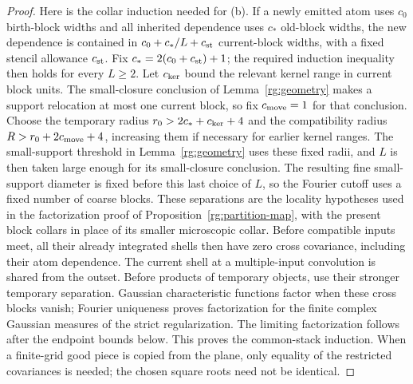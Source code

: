 \begin{proof}
Here is the collar induction needed for (b). If a newly emitted atom uses
$c_0$ birth-block widths and all inherited dependence uses $c_*$ old-block
widths, the new dependence is contained in
$c_0+c_*/L+c_{\rm st}$ current-block widths, with a fixed stencil allowance
$c_{\rm st}$. Fix $c_*=2(c_0+c_{\rm st})+1$; the required induction
inequality then holds for every $L\ge2$. Let $c_{\rm ker}$ bound the
relevant kernel range in current block units. The small-closure conclusion
of Lemma~\ref{rg:geometry} makes a support relocation at most one current
block, so fix $c_{\rm move}=1$ for that conclusion. Choose the temporary radius
$r_0>2c_*+c_{\rm ker}+4$ and the compatibility radius
$R>r_0+2c_{\rm move}+4$, increasing them if necessary for earlier
kernel ranges. The small-support threshold in Lemma~\ref{rg:geometry}
uses these fixed radii, and $L$ is then taken large enough for its
small-closure conclusion. The resulting fine small-support diameter is
fixed before this last choice of $L$, so the Fourier cutoff uses a fixed
number of coarse blocks. These separations
are the locality hypotheses used in the factorization proof of
Proposition~\ref{rg:partition-map}, with the present block collars in
place of its smaller microscopic collar. Before
compatible inputs meet, all their already integrated shells then have
zero cross covariance, including their atom dependence. The current
shell at a multiple-input convolution is shared from the outset.
Before products of temporary objects, use their stronger temporary
separation. Gaussian characteristic functions factor when these cross
blocks vanish; Fourier uniqueness proves factorization for the finite
complex Gaussian measures of the strict regularization. The limiting
factorization follows after the endpoint bounds below. This proves the
common-stack induction. When a finite-grid good piece is copied from the
plane, only equality of the restricted covariances is needed; the chosen
square roots need not be identical.


\end{proof}
